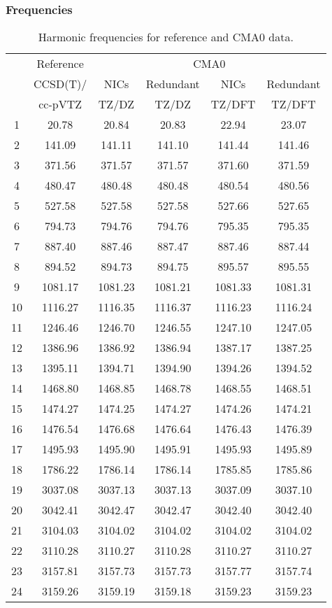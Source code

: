 \documentclass[10pt,oneside]{article}
\begin{document}
\begin{table}[h!]
\subsubsection*{Frequencies}
\centering
\caption{Harmonic frequencies for reference and CMA0 data.}
\begin{tabular}{cccccc}
\toprule
{} & Reference & \multicolumn{4}{c}{CMA0} \\
{} &  CCSD(T)/ &    NICs &  Redundant &    NICs & Redundant \\
{} &   cc-pVTZ &   TZ/DZ &      TZ/DZ &  TZ/DFT &    TZ/DFT \\
\midrule
1  &     20.78 &   20.84 &      20.83 &   22.94 &     23.07 \\
2  &    141.09 &  141.11 &     141.10 &  141.44 &    141.46 \\
3  &    371.56 &  371.57 &     371.57 &  371.60 &    371.59 \\
4  &    480.47 &  480.48 &     480.48 &  480.54 &    480.56 \\
5  &    527.58 &  527.58 &     527.58 &  527.66 &    527.65 \\
6  &    794.73 &  794.76 &     794.76 &  795.35 &    795.35 \\
7  &    887.40 &  887.46 &     887.47 &  887.46 &    887.44 \\
8  &    894.52 &  894.73 &     894.75 &  895.57 &    895.55 \\
9  &   1081.17 & 1081.23 &    1081.21 & 1081.33 &   1081.31 \\
10 &   1116.27 & 1116.35 &    1116.37 & 1116.23 &   1116.24 \\
11 &   1246.46 & 1246.70 &    1246.55 & 1247.10 &   1247.05 \\
12 &   1386.96 & 1386.92 &    1386.94 & 1387.17 &   1387.25 \\
13 &   1395.11 & 1394.71 &    1394.90 & 1394.26 &   1394.52 \\
14 &   1468.80 & 1468.85 &    1468.78 & 1468.55 &   1468.51 \\
15 &   1474.27 & 1474.25 &    1474.27 & 1474.26 &   1474.21 \\
16 &   1476.54 & 1476.68 &    1476.64 & 1476.43 &   1476.39 \\
17 &   1495.93 & 1495.90 &    1495.91 & 1495.93 &   1495.89 \\
18 &   1786.22 & 1786.14 &    1786.14 & 1785.85 &   1785.86 \\
19 &   3037.08 & 3037.13 &    3037.13 & 3037.09 &   3037.10 \\
20 &   3042.41 & 3042.47 &    3042.47 & 3042.40 &   3042.40 \\
21 &   3104.03 & 3104.02 &    3104.02 & 3104.02 &   3104.02 \\
22 &   3110.28 & 3110.27 &    3110.28 & 3110.27 &   3110.27 \\
23 &   3157.81 & 3157.73 &    3157.73 & 3157.77 &   3157.74 \\
24 &   3159.26 & 3159.19 &    3159.18 & 3159.23 &   3159.23 \\
\bottomrule
\end{tabular}
\end{table}
\end{document}
